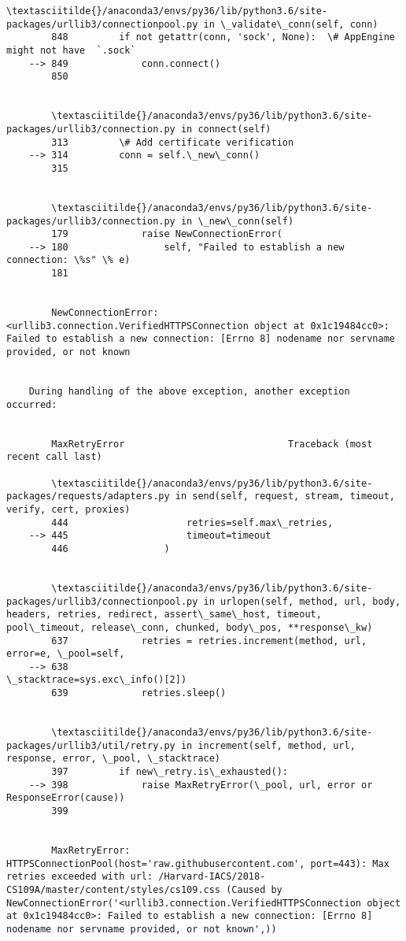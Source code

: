 \documentclass[11pt]{article}
\begin{document}
\begin{Verbatim}[commandchars=\\\{\}]
        \textasciitilde{}/anaconda3/envs/py36/lib/python3.6/site-packages/urllib3/connectionpool.py in \_validate\_conn(self, conn)
        848         if not getattr(conn, 'sock', None):  \# AppEngine might not have  `.sock`
    --> 849             conn.connect()
        850 


        \textasciitilde{}/anaconda3/envs/py36/lib/python3.6/site-packages/urllib3/connection.py in connect(self)
        313         \# Add certificate verification
    --> 314         conn = self.\_new\_conn()
        315 


        \textasciitilde{}/anaconda3/envs/py36/lib/python3.6/site-packages/urllib3/connection.py in \_new\_conn(self)
        179             raise NewConnectionError(
    --> 180                 self, "Failed to establish a new connection: \%s" \% e)
        181 


        NewConnectionError: <urllib3.connection.VerifiedHTTPSConnection object at 0x1c19484cc0>: Failed to establish a new connection: [Errno 8] nodename nor servname provided, or not known

        
    During handling of the above exception, another exception occurred:


        MaxRetryError                             Traceback (most recent call last)

        \textasciitilde{}/anaconda3/envs/py36/lib/python3.6/site-packages/requests/adapters.py in send(self, request, stream, timeout, verify, cert, proxies)
        444                     retries=self.max\_retries,
    --> 445                     timeout=timeout
        446                 )


        \textasciitilde{}/anaconda3/envs/py36/lib/python3.6/site-packages/urllib3/connectionpool.py in urlopen(self, method, url, body, headers, retries, redirect, assert\_same\_host, timeout, pool\_timeout, release\_conn, chunked, body\_pos, **response\_kw)
        637             retries = retries.increment(method, url, error=e, \_pool=self,
    --> 638                                         \_stacktrace=sys.exc\_info()[2])
        639             retries.sleep()


        \textasciitilde{}/anaconda3/envs/py36/lib/python3.6/site-packages/urllib3/util/retry.py in increment(self, method, url, response, error, \_pool, \_stacktrace)
        397         if new\_retry.is\_exhausted():
    --> 398             raise MaxRetryError(\_pool, url, error or ResponseError(cause))
        399 


        MaxRetryError: HTTPSConnectionPool(host='raw.githubusercontent.com', port=443): Max retries exceeded with url: /Harvard-IACS/2018-CS109A/master/content/styles/cs109.css (Caused by NewConnectionError('<urllib3.connection.VerifiedHTTPSConnection object at 0x1c19484cc0>: Failed to establish a new connection: [Errno 8] nodename nor servname provided, or not known',))


\end{Verbatim}
\end{document}
